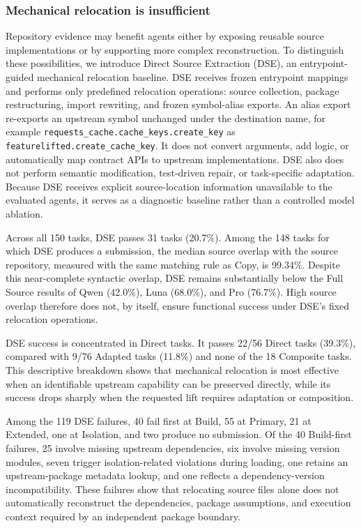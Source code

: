 \documentclass[acmsmall,screen,review,anonymous]{acmart}
\begin{document}
\subsubsection{Mechanical relocation is insufficient}

Repository evidence may benefit agents either by exposing reusable source
implementations or by supporting more complex reconstruction. To distinguish
these possibilities, we introduce Direct Source Extraction (DSE), an
entrypoint-guided mechanical relocation baseline. DSE receives frozen entrypoint
mappings and performs only
predefined relocation operations: source collection, package restructuring,
import rewriting, and frozen symbol-alias exports. An alias export re-exports an
upstream symbol unchanged under the destination name, for example
\texttt{requests\_cache.cache\_keys.create\_key} as
\texttt{featurelifted.create\_cache\_key}. It does not convert arguments, add
logic, or automatically map contract APIs to upstream implementations.
DSE also does not perform semantic modification, test-driven repair, or
task-specific adaptation.
Because DSE receives explicit source-location information unavailable to the
evaluated agents, it serves as a diagnostic baseline rather than a controlled
model ablation.

Across all 150 tasks, DSE passes 31 tasks (20.7\%). Among the 148 tasks for
which DSE produces a submission, the median source overlap with the source
repository, measured with the same matching rule as Copy, is 99.34\%. Despite this near-complete syntactic overlap,
DSE remains substantially below the Full Source results of Qwen (42.0\%),
Luna (68.0\%), and Pro (76.7\%). High source overlap therefore does not, by
itself, ensure functional success under DSE's fixed relocation operations.

DSE success is concentrated in Direct tasks. It passes 22/56 Direct tasks
(39.3\%), compared with 9/76 Adapted tasks (11.8\%) and none of the 18
Composite tasks. This descriptive breakdown shows that mechanical relocation
is most effective when an identifiable upstream capability can be preserved
directly, while its success drops sharply when the requested lift requires
adaptation or composition.

Among the 119 DSE failures, 40 fail first at Build, 55 at Primary, 21 at
Extended, one at Isolation, and two produce no submission. Of the 40
Build-first failures, 25 involve missing upstream dependencies, six involve
missing version modules, seven trigger isolation-related violations during
loading, one retains an upstream-package metadata lookup, and one reflects a
dependency-version incompatibility. These failures show that relocating source
files alone does not automatically reconstruct the dependencies, package
assumptions, and execution context required by an independent package
boundary.
\end{document}
